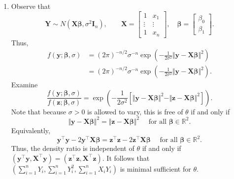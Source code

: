 \documentclass[11pt]{article}
\newcommand{\R}{\mathbb{R}}
\begin{document}
\begin{enumerate}
\begin{enumerate}
            \item Observe that \[
                \bm{Y} \sim N(\bm{X}\bm{\beta}, \sigma^2 \bm{I}_n), \qquad
                \bm{X} = \begin{bmatrix}
                    1 & x_1 \\
                    \vdots & \vdots \\
                    1 & x_n
                \end{bmatrix}, \quad
                \bm{\beta} = \begin{bmatrix}
                    \beta_0 \\
                    \beta_1
                \end{bmatrix}.
            \] Thus, \begin{align*}
                f(\bm{y}; \bm{\beta}, \sigma)
                    &= (2\pi)^{-n/2} \sigma^{-n}\exp\left(-\frac{1}{2\sigma^2} \Vert \bm{y} - \bm{X}\bm{\beta}\Vert^2\right) \\
                    &= (2\pi)^{-n/2} \sigma^{-n}\exp\left(-\frac{1}{2\sigma^2} \Vert \bm{y} - \bm{X}\bm{\beta}\Vert^2\right).
            \end{align*}
            Examine \[
                \frac{f(\bm{y}; \bm{\beta}, \sigma)}{f(\bm{z}; \bm{\beta}, \sigma)} = \exp\left(-\frac{1}{2\sigma^2}\left[\Vert \bm{y} - \bm{X}\bm{\beta}\Vert^2 - \Vert \bm{z} - \bm{X}\bm{\beta}\Vert^2\right]\right).
            \] Note that because $\sigma > 0$ is allowed to vary, this is free
            of $\theta$ if and only if \[
                \Vert \bm{y} - \bm{X}\bm{\beta}\Vert^2 = \Vert \bm{z} - \bm{X}\bm{\beta}\Vert^2 \quad\text{ for all } \bm{\beta} \in \R^2.
            \] Equivalently, \[
                \bm{y}^\top\bm{y} - 2\bm{y}^\top\bm{X}\bm{\beta} = \bm{z}^\top\bm{z} - 2\bm{z}^\top\bm{X}\bm{\beta} \quad\text{ for all } \bm{\beta} \in \R^2.
            \] Thus, the density ratio is independent of $\theta$ if and only
            if $(\bm{y}^\top\bm{y}, \bm{X}^\top\bm{y}) = (\bm{z}^\top\bm{z},
            \bm{X}^\top\bm{z})$.
            It follows that $(\sum_{i = 1}^n Y_i, \sum_{i = 1}^n Y_i^2,
            \sum_{i = 1}^n X_iY_i)$ is minimal sufficient for $\theta$.
        \end{enumerate}




\end{enumerate}
\end{document}
